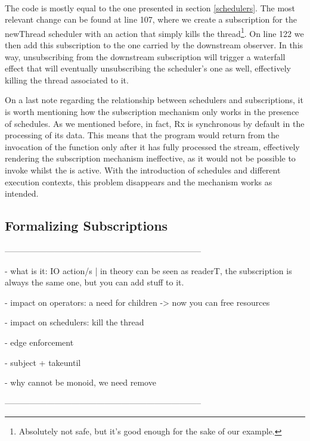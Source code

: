 \\

The code is mostly equal to the one presented in section \ref{schedulers}. The most relevant change can be found at line 107, where we create a subscription for the newThread scheduler with an action that simply kills the thread\footnote{Absolutely not safe, but it's good enough for the sake of our example.}. On line 122 we then add this subscription to the one carried by the downstream observer. In this way, unsubscribing from the downstream subscription will trigger a waterfall effect that will eventually unsubscribing the scheduler's one as well, effectively killing the thread associated to it.

On a last note regarding the relationship between schedulers and subscriptions, it is worth mentioning how the subscription mechanism only works in the presence of schedules. As we mentioned before, in fact, Rx is synchronous by default in the processing of its data. This means that the program would return from the invocation of the  function only after it has fully processed the stream, effectively rendering the subscription mechanism ineffective, as it would not be possible to invoke  whilst the  is active. With the introduction of schedules and different execution contexts, this problem disappears and the mechanism works as intended.

\subsection{Formalizing Subscriptions}


-----------------------------------------------------------------------

- what is it: IO action/s | in theory can be seen as readerT, the subscription is always the same one, but you can add stuff to it. 

- impact on operators: a need for children -> now you can free resources 

- impact on schedulers: kill the thread

- edge enforcement

- subject + takeuntil

- why cannot be monoid, we need remove

-----------------------------------------------------------------------

